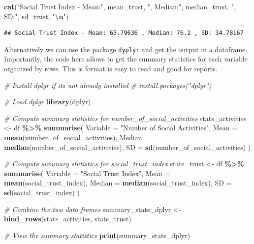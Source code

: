 \documentclass[
  11pt,
]{article}
\newenvironment{Shaded}{\begin{snugshade}}{\end{snugshade}}
\newcommand{\AttributeTok}[1]{\textcolor[rgb]{0.13,0.29,0.53}{#1}}
\newcommand{\CommentTok}[1]{\textcolor[rgb]{0.56,0.35,0.01}{\textit{#1}}}
\newcommand{\FunctionTok}[1]{\textcolor[rgb]{0.13,0.29,0.53}{\textbf{#1}}}
\newcommand{\NormalTok}[1]{#1}
\newcommand{\OtherTok}[1]{\textcolor[rgb]{0.56,0.35,0.01}{#1}}
\newcommand{\SpecialCharTok}[1]{\textcolor[rgb]{0.81,0.36,0.00}{\textbf{#1}}}
\newcommand{\StringTok}[1]{\textcolor[rgb]{0.31,0.60,0.02}{#1}}
\begin{document}
\begin{Shaded}
\begin{Highlighting}[]
\FunctionTok{cat}\NormalTok{(}\StringTok{"Social Trust Index {-} Mean:"}\NormalTok{, mean\_trust, }\StringTok{", Median:"}\NormalTok{, median\_trust, }\StringTok{", SD:"}\NormalTok{,}
\NormalTok{    sd\_trust, }\StringTok{"}\SpecialCharTok{\textbackslash{}n}\StringTok{"}\NormalTok{)}
\end{Highlighting}
\end{Shaded}

\begin{verbatim}
## Social Trust Index - Mean: 65.79636 , Median: 76.2 , SD: 34.78167
\end{verbatim}

Alternatively we can use the package \texttt{dyplyr} and get the output
in a dataframe. Importantly, the code here allows to get the summary
statistics for each variable organized by rows. This is format is easy
to read and good for reports.

\begin{Shaded}
\begin{Highlighting}[]
\CommentTok{\# Install dplyr if it\textquotesingle{}s not already installed}
\CommentTok{\# install.packages("dplyr")}

\CommentTok{\# Load dplyr}
\FunctionTok{library}\NormalTok{(dplyr)}


\CommentTok{\# Compute summary statistics for \textquotesingle{}number\_of\_social\_activities\textquotesingle{}}
\NormalTok{stats\_activities }\OtherTok{\textless{}{-}}\NormalTok{ df }\SpecialCharTok{\%\textgreater{}\%}
  \FunctionTok{summarise}\NormalTok{(}
    \AttributeTok{Variable =} \StringTok{"Number of Social Activities"}\NormalTok{,}
    \AttributeTok{Mean =} \FunctionTok{mean}\NormalTok{(number\_of\_social\_activities),}
    \AttributeTok{Median =} \FunctionTok{median}\NormalTok{(number\_of\_social\_activities),}
    \AttributeTok{SD =} \FunctionTok{sd}\NormalTok{(number\_of\_social\_activities)}
\NormalTok{  )}

\CommentTok{\# Compute summary statistics for \textquotesingle{}social\_trust\_index\textquotesingle{}}
\NormalTok{stats\_trust }\OtherTok{\textless{}{-}}\NormalTok{ df }\SpecialCharTok{\%\textgreater{}\%}
  \FunctionTok{summarise}\NormalTok{(}
    \AttributeTok{Variable =} \StringTok{"Social Trust Index"}\NormalTok{,}
    \AttributeTok{Mean =} \FunctionTok{mean}\NormalTok{(social\_trust\_index),}
    \AttributeTok{Median =} \FunctionTok{median}\NormalTok{(social\_trust\_index),}
    \AttributeTok{SD =} \FunctionTok{sd}\NormalTok{(social\_trust\_index)}
\NormalTok{  )}

\CommentTok{\# Combine the two data frames}
\NormalTok{summary\_stats\_dplyr }\OtherTok{\textless{}{-}} \FunctionTok{bind\_rows}\NormalTok{(stats\_activities, stats\_trust)}

\CommentTok{\# View the summary statistics}
\FunctionTok{print}\NormalTok{(summary\_stats\_dplyr)}
\end{Highlighting}
\end{Shaded}
\end{document}
